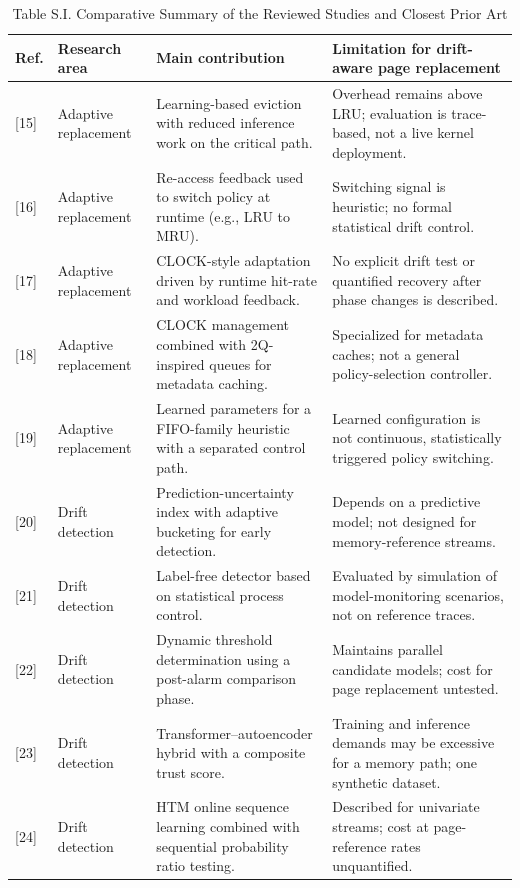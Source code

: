 \documentclass[journal,onecolumn]{IEEEtran}
\begin{document}
\begin{table}[!t]
\caption{Table S.I. Comparative Summary of the Reviewed Studies and Closest Prior Art}
\label{tab:lit}
\small
\begin{tabular}{@{}p{}p{}p{}p{}@{}}
\toprule
Ref. & Research area & Main contribution & Limitation for drift-aware page replacement \\
\midrule
{[15]} & Adaptive replacement & Learning-based eviction with reduced inference work on the critical path. & Overhead remains above LRU; evaluation is trace-based, not a live kernel deployment. \\
{[16]} & Adaptive replacement & Re-access feedback used to switch policy at runtime (e.g., LRU to MRU). & Switching signal is heuristic; no formal statistical drift control. \\
{[17]} & Adaptive replacement & CLOCK-style adaptation driven by runtime hit-rate and workload feedback. & No explicit drift test or quantified recovery after phase changes is described. \\
{[18]} & Adaptive replacement & CLOCK management combined with 2Q-inspired queues for metadata caching. & Specialized for metadata caches; not a general policy-selection controller. \\
{[19]} & Adaptive replacement & Learned parameters for a FIFO-family heuristic with a separated control path. & Learned configuration is not continuous, statistically triggered policy switching. \\
{[20]} & Drift detection & Prediction-uncertainty index with adaptive bucketing for early detection. & Depends on a predictive model; not designed for memory-reference streams. \\
{[21]} & Drift detection & Label-free detector based on statistical process control. & Evaluated by simulation of model-monitoring scenarios, not on reference traces. \\
{[22]} & Drift detection & Dynamic threshold determination using a post-alarm comparison phase. & Maintains parallel candidate models; cost for page replacement untested. \\
{[23]} & Drift detection & Transformer--autoencoder hybrid with a composite trust score. & Training and inference demands may be excessive for a memory path; one synthetic dataset. \\
{[24]} & Drift detection & HTM online sequence learning combined with sequential probability ratio testing. & Described for univariate streams; cost at page-reference rates unquantified. \\

\end{tabular}
\end{table}
\end{document}
